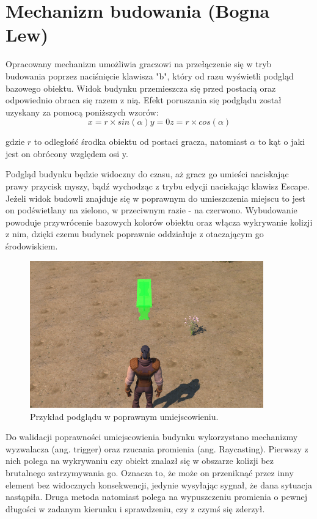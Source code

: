 \section{Mechanizm budowania (Bogna Lew)}

Opracowany mechanizm umożliwia graczowi na przełączenie się w tryb budowania poprzez naciśnięcie klawisza "b", który od razu
wyświetli podgląd bazowego obiektu. Widok budynku przemieszcza się przed postacią oraz odpowiednio obraca się razem z
nią. Efekt poruszania się podglądu został uzyskany za pomocą poniższych wzorów:
\begin{equation}
  \label{xBudowanie} x = r \times sin(\alpha)
  \label{yBudowanie} y = 0
  \label{zBudowanie} z = r \times cos(\alpha)
\end{equation}

gdzie $r$ to odległość środka obiektu od postaci gracza, natomiast $\alpha$ to kąt o jaki jest on obrócony względem osi y.

Podgląd budynku będzie widoczny do czasu, aż gracz go umieści naciskając prawy przycisk myszy, bądź wychodząc z trybu
edycji naciskając klawisz Escape. Jeżeli widok budowli znajduje się w poprawnym do umieszczenia miejscu to jest on
podświetlany na zielono, w przeciwnym razie - na czerwono. Wybudowanie powoduje przywrócenie bazowych kolorów obiektu
oraz włącza wykrywanie kolizji z nim, dzięki czemu budynek poprawnie oddziałuje z otaczającym go środowiskiem.

\begin{figure}[h!]
    \centering
    \includegraphics[width=0.9\textwidth]{images/implementacja/mechanizm_budowania/poprawne.png}
    \caption{Przykład podglądu w poprawnym umiejscowieniu.}
\end{figure}

Do walidacji poprawności umiejscowienia budynku wykorzystano mechanizmy wyzwalacza (ang. trigger) oraz rzucania
promienia (ang. Raycasting). Pierwszy z nich polega na wykrywaniu czy obiekt znalazł się w obszarze kolizji bez
brutalnego zatrzymywania go. Oznacza to, że może on przeniknąć przez inny element bez widocznych konsekwencji, jedynie
wysyłając sygnał, że dana sytuacja nastąpiła. Druga metoda natomiast polega na wypuszczeniu promienia o pewnej długości
w zadanym kierunku i sprawdzeniu, czy z czymś się zderzył.

